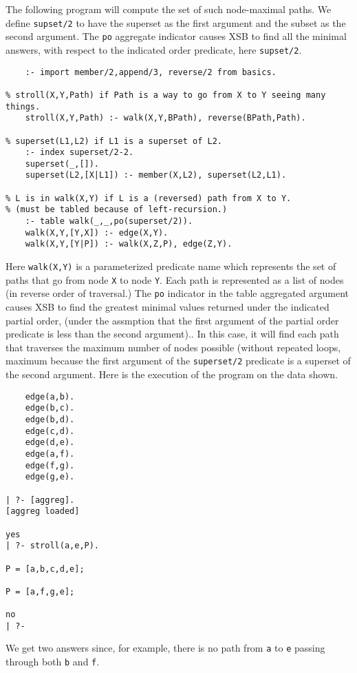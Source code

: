 The following program will compute the set of such node-maximal paths.
We define {\tt supset/2} to have the superset as the first argument
and the subset as the second argument.  The {\tt po} aggregate
indicator causes XSB to find all the minimal answers, with respect to
the indicated order predicate, here {\tt supset/2}.
\begin{verbatim}
    :- import member/2,append/3, reverse/2 from basics.

% stroll(X,Y,Path) if Path is a way to go from X to Y seeing many things.
    stroll(X,Y,Path) :- walk(X,Y,BPath), reverse(BPath,Path).

% superset(L1,L2) if L1 is a superset of L2.
    :- index superset/2-2.
    superset(_,[]).
    superset(L2,[X|L1]) :- member(X,L2), superset(L2,L1).

% L is in walk(X,Y) if L is a (reversed) path from X to Y.
% (must be tabled because of left-recursion.)
    :- table walk(_,_,po(superset/2)).
    walk(X,Y,[Y,X]) :- edge(X,Y).
    walk(X,Y,[Y|P]) :- walk(X,Z,P), edge(Z,Y).
\end{verbatim}

Here \verb|walk(X,Y)| is a parameterized predicate name which
represents the set of paths that go from node \verb|X| to node
\verb|Y|.  Each path is represented as a list of nodes (in reverse
order of traversal.)  The {\tt po} indicator in the table aggregated
argument causes XSB to find the greatest minimal values returned under
the indicated partial order, (under the assmption that the first
argument of the partial order predicate is less than the second
argument)..  In this case, it will find each path that traverses the
maximum number of nodes possible (without repeated loops, maximum
because the first argument of the {\tt superset/2} predicate is a
superset of the second argument.  Here is the execution of the program
on the data shown.
\begin{verbatim}
    edge(a,b).
    edge(b,c).
    edge(b,d).
    edge(c,d).
    edge(d,e).
    edge(a,f).
    edge(f,g).
    edge(g,e).

| ?- [aggreg].
[aggreg loaded]

yes
| ?- stroll(a,e,P).

P = [a,b,c,d,e];

P = [a,f,g,e];

no
| ?- 
\end{verbatim}
We get two answers since, for example, there is no path from {\tt a}
to {\tt e} passing through both {\tt b} and {\tt f}.

